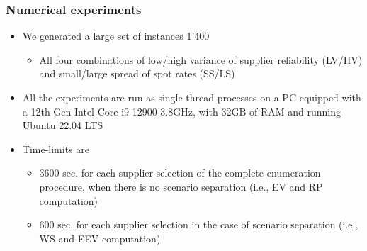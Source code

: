 \documentclass[,9pt,xcolor={dvipsnames}]{beamer} %
\begin{document}
\begin{frame}%
	\frametitle{Numerical experiments}
	\begin{itemize}
		\small
		\item<1-> We generated a large set of instances 1'400
		\begin{itemize}
			\item<2-> All four combinations of low/high variance of supplier reliability (LV/HV) and small/large spread of spot rates (SS/LS)%
		\end{itemize}
		\bigskip
		\item<3-> All the experiments are run as single thread processes on a PC equipped with a 12th Gen Intel Core i9-12900 3.8GHz, with 32GB of RAM and running Ubuntu 22.04 LTS
		\bigskip
		\item<4-> Time-limits are
		\begin{itemize}
			\item<5-> 3600 sec. for each supplier selection of the complete enumeration procedure, when there is no scenario separation (i.e., EV and RP computation)
			\item<6->  600 sec. for each supplier selection in the case of scenario separation (i.e., WS and EEV computation)
		\end{itemize}
	\end{itemize}
\end{frame}
\end{document}
